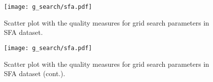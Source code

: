 \begin{figure}[!htb]
    \centering
    \texttt{[image: g\_search/sfa.pdf]}

    \caption{Scatter plot with the quality measures for grid search parameters in SFA dataset.}
\end{figure}
\begin{figure}[!htb]
    \ContinuedFloat
    \centering
    \texttt{[image: g\_search/sfa.pdf]}

    \caption{Scatter plot with the quality measures for grid search parameters in SFA dataset (cont.).}
    \label{fig:sfa_g_search}
\end{figure}